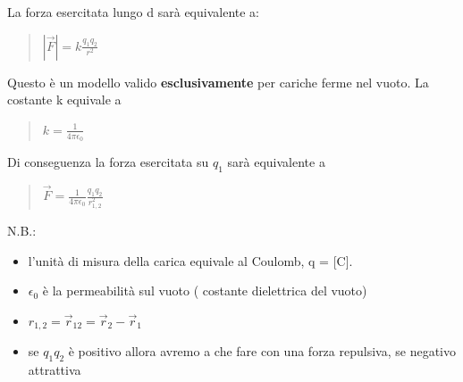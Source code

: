 \documentclass{book}
\begin{document}
La forza esercitata lungo d sarà equivalente a:
\begin{quote}
    \begin{math}
        |\vec{F}|=k\frac{q_1q_2}{r^2}
    \end{math}
\end{quote}
Questo è un modello valido \textbf{esclusivamente} per cariche ferme nel vuoto. La costante k 
equivale a
\begin{quote}
    \begin{math}
        k=\frac{1}{4\pi\epsilon_0}
    \end{math}
\end{quote}
Di conseguenza la forza esercitata su $q_1$ sarà equivalente a
\begin{quote}
    \begin{math}
        \vec{F}=\frac{1}{4\pi\epsilon_0}\frac{q_1q_2}{r^{2}_{1,2}}
    \end{math}
\end{quote}

N.B.: \begin{itemize}
    \item l'unità di misura della carica equivale al Coulomb, q = [C].
    \item \begin{math}
        \epsilon_0
    \end{math} è la permeabilità sul vuoto (  costante dielettrica del vuoto)
    \item \begin{math}
        r_{1,2} = \vec{r}_{12} = \vec{r}_2 - \vec{r}_1
    \end{math}
    \item se \begin{math}
        q_1q_2
    \end{math} è positivo allora avremo a che fare con una forza repulsiva, se negativo attrattiva
\end{itemize}
\end{document}
